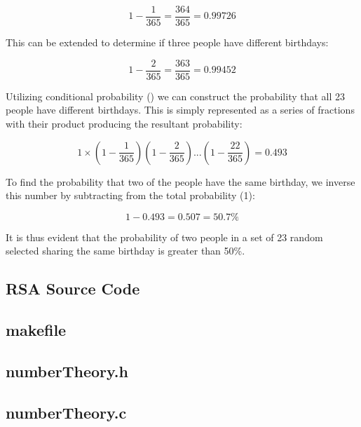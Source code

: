 \documentclass[]{article}
\begin{document}
$$1-\frac{1}{365}=\frac{364}{365}=0.99726$$

\vspace{0.5cm}
\noindent
This can be extended to determine if three people have different birthdays:

$$1-\frac{2}{365}=\frac{363}{365}=0.99452$$

\vspace{0.5cm}
\noindent
Utilizing conditional probability (\cite{lecture2}) we can construct the probability that all 23 people have different birthdays. This is simply represented as a series of fractions with their product producing the resultant probability:

$$1\times(1-\frac{1}{365})(1-\frac{2}{365})...(1-\frac{22}{365})=0.493$$

\vspace{0.5cm}
\noindent
To find the probability that two of the people have the same birthday, we inverse this number by subtracting from the total probability (1):

$$1-0.493=0.507=50.7\%$$

\vspace{0.5cm}
\noindent
It is thus evident that the probability of two people in a set of 23 random selected sharing the same birthday is greater than 50\%.

\pagebreak


\vspace*{-0.8cm}
\begin{center}
	\section*{RSA Source Code}
\end{center}

\subsection*{makefile}
\pagebreak{}
\subsection*{numberTheory.h}
\pagebreak{}
\subsection*{numberTheory.c}
\pagebreak{}
\end{document}
